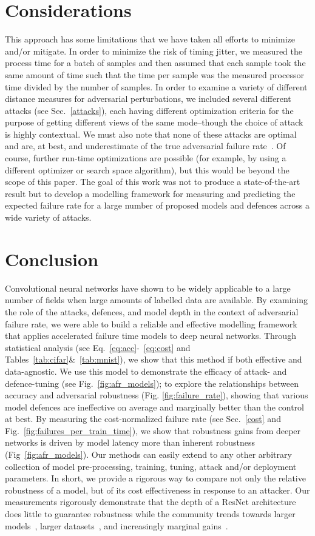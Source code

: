 \textit{}\section{Considerations}
This approach has some limitations that we have taken all efforts to minimize and/or mitigate. In order to minimize the risk of timing jitter, we measured the process time for a batch of samples and then assumed that each sample took the same amount of time such that the time per sample was the measured processor time divided by the number of samples. In order to examine a variety of different distance measures for adversarial perturbations, we included several different attacks (see Sec.~\ref{attacks}), each having different optimization criteria for the purpose of getting different views of the same mode--though the choice of attack is highly contextual. We must also note that none of these attacks are optimal and are, at best, and underestimate of the true adversarial failure rate~\citep{meyers}. Of course, further run-time optimizations are possible (for example, by using a different optimizer or search space algorithm), but this would be beyond the scope of this paper. The goal of this work was not to produce a state-of-the-art result but to develop a modelling framework for measuring and predicting the expected failure rate for a large number of proposed models and defences across a wide variety of attacks.

\section{Conclusion}
Convolutional neural networks have shown to be widely applicable to a large number of fields when large amounts of labelled data are available. By examining the role of the attacks, defences, and model depth in the context of adversarial failure rate, we were able to build a reliable and effective modelling framework that applies accelerated failure time models to deep neural networks. Through statistical analysis (see Eq.~\ref{eq:acc}-~\ref{eq:cost} and Tables~\ref{tab:cifar}\&~\ref{tab:mnist}), we show that this method if both effective and data-agnostic.  We use this model to demonstrate the efficacy of attack- and defence-tuning (see Fig.~\ref{fig:afr_models}); to  explore the relationships between accuracy and adversarial robustness (Fig. \ref{fig:failure_rate}), showing that various model defences are ineffective on average and marginally better than the control at best.
By measuring the cost-normalized failure rate (see Sec.~\ref{cost} and Fig.~\ref{fig:failures_per_train_time}), we show that robustness gains from deeper networks is driven by model latency more than inherent robustness (Fig~\ref{fig:afr_models}). Our methods can easily extend to any other arbitrary collection of model pre-processing, training, tuning, attack and/or deployment parameters. In short, we provide a rigorous way to compare not only the relative robustness of a model, but of its cost effectiveness in response to an attacker. Our measurements rigorously demonstrate  that the depth of a ResNet architecture does little to guarantee robustness while the community trends towards larger models~\cite{}, larger datasets~\cite{}, and increasingly marginal gains~\cite{}.
